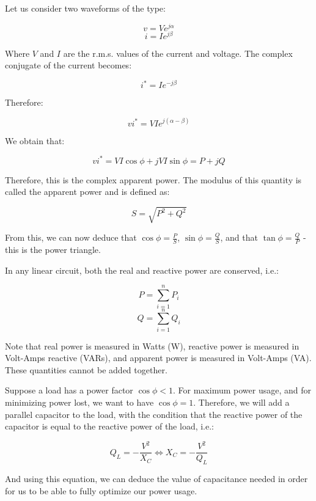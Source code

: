 \documentclass{article}
\begin{document}
\begin{definition}
    Let us consider two waveforms of the type:

    \[ v = Ve^{j\alpha} \]
    \[ i = Ie^{j\beta} \]

    Where $V$ and $I$ are the r.m.s. values of the current and voltage. The complex conjugate of the current becomes:

    \[ i^* = Ie^{-j\beta} \]

    Therefore:

    \[ vi^* = VIe^{j(\alpha - \beta)} \]

    We obtain that:

    \[ vi^* = VI\cos{\phi} + jVI\sin{\phi} = P + jQ \]

    Therefore, this is the complex apparent power. The modulus of this quantity is called the apparent power and is defined as:

    \[ S = \sqrt{P^2 + Q^2} \]

    From this, we can now deduce that $\cos{\phi} = \frac{P}{S}$, $\sin{\phi} = \frac{Q}{S}$, and that $\tan{\phi} = \frac{Q}{P}$ - this is the power triangle.
\end{definition}

\begin{proposition}
    In any linear circuit, both the real and reactive power are conserved, i.e.:

    \[ P = \sum_{i = 1}^n P_i \]
    \[ Q = \sum_{i = 1}^n Q_i \]
\end{proposition}

Note that real power is measured in Watts (W), reactive power is measured in Volt-Amps reactive (VARs), and apparent power is measured in Volt-Amps (VA). These quantities cannot be added together.

\begin{proposition}
    Suppose a load has a power factor $\cos{\phi} < 1$. For maximum power usage, and for minimizing power lost, we want to have $\cos{\phi} = 1$. Therefore, we will add a parallel capacitor to the load, with the condition that the reactive power of the capacitor is equal to the reactive power of the load, i.e.:

    \[ Q_L = -\frac{V^2}{X_C} \iff X_C = -\frac{V^2}{Q_L} \]

    And using this equation, we can deduce the value of capacitance needed in order for us to be able to fully optimize our power usage.
\end{proposition}
\end{document}
